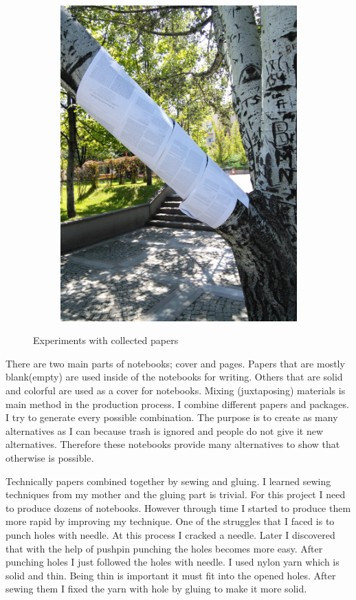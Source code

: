 \begin{figure}
\begin{subfigure}[b]{0.48\textwidth}
    \includegraphics[width=\textwidth]{project_graphics/tree_experiment2.jpg}
  \end{subfigure}
  \caption{Experiments with collected papers}
  \label{fig:ExperimentWithPaper}
\end{figure}

There are two main parts of notebooks; cover and pages. Papers that are mostly blank(empty) are used inside of the notebooks for writing. Others that are solid and colorful are used as a cover for notebooks. Mixing (juxtaposing) materials is main method in the production process. I combine different papers and packages. I try to generate every possible combination. The purpose is to create as many alternatives as I can because trash is ignored and people do not give it new alternatives. Therefore these notebooks provide many alternatives to show that otherwise is possible. 

Technically papers combined together by sewing and gluing. I learned sewing techniques from my mother and the gluing part is trivial. For this project I need to produce dozens of notebooks. However through time I started to produce them more rapid by improving my technique. One of the struggles that I faced is to punch holes with needle. At this process I cracked a needle. Later I discovered that with the help of pushpin punching the holes becomes more easy. After punching holes I just followed the holes with needle. I used nylon yarn which is solid and thin. Being thin is important it must fit into the opened holes. After sewing them I fixed the yarn with hole by gluing to make it more solid.

